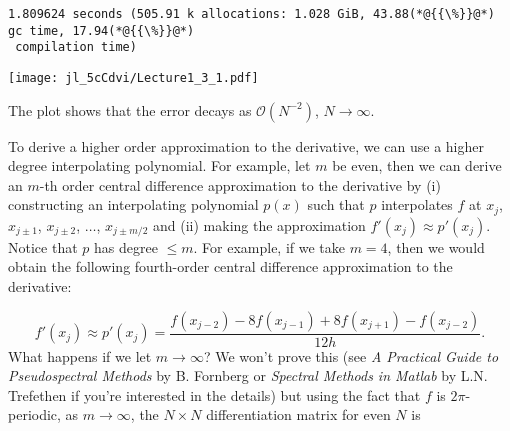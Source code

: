 \documentclass[12pt,a4paper]{article}
\begin{document}
\begin{lstlisting}
1.809624 seconds (505.91 k allocations: 1.028 GiB, 43.88(*@{{\%}}@*) gc time, 17.94(*@{{\%}}@*)
 compilation time)
\end{lstlisting}

\texttt{[image: jl\_5cCdvi/Lecture1\_3\_1.pdf]}

The plot shows that the error decays as $\mathcal{O}(N^{-2})$, $N \to \infty$.

To derive a higher order approximation to the derivative, we can use a higher degree interpolating polynomial.  For example, let $m$ be even, then we can derive an $m$-th order central difference approximation to the derivative by (i) constructing an interpolating polynomial $p(x)$ such that $p$ interpolates $f$ at $x_j$, $x_{j\pm 1}$, $x_{j\pm 2}$, $\ldots$,  $x_{j\pm m/2}$ and (ii) making the approximation $f'(x_j) \approx p'(x_j)$. Notice that $p$ has degree $\leq m$. For example, if we take $m = 4$, then we would obtain the following fourth-order central difference approximation to the derivative:

\[
f'(x_j) \approx p'(x_j) = \frac{f(x_{j-2}) -8 f(x_{j-1}) + 8 f(x_{j+1}) - f(x_{j-2})}{12h}.
\]
What happens if we let $m \to \infty$? We won't prove this (see \emph{A Practical Guide to Pseudospectral Methods} by B. Fornberg or \emph{Spectral Methods in Matlab} by L.N. Trefethen if you're interested in the details) but using the fact that $f$ is $2\pi$-periodic, as $m \to \infty$, the $N \times N$ differentiation matrix for even $N$ is 
\end{document}
